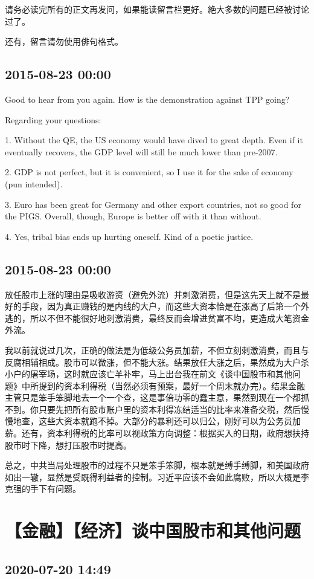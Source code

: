 \documentclass[twocolumn]{ctexart}
\begin{document}
请务必读完所有的正文再发问，如果能读留言栏更好。絶大多数的问题已经被讨论过了。

还有，留言请勿使用俳句格式。\subsection*{2015-08-23 00:00}
Good to hear from you again. How is the demonstration against TPP going?

Regarding your questions:

1. Without the QE, the US economy would have dived to great depth. Even if it eventually recovers, the GDP level will still be much lower than pre-2007.

2. GDP is not perfect, but it is convenient, so I use it for the sake of economy (pun intended).

3. Euro has been great for Germany and other export countries, not so good for the PIGS. Overall, though, Europe is better off with it than without.

4. Yes, tribal bias ends up hurting oneself. Kind of a poetic justice.\subsection*{2015-08-23 00:00}
放任股市上涨的理由是吸收游资（避免外流）并刺激消费，但是这先天上就不是最好的手段，因为真正赚钱的是内线的大户，而这些大资本恰是在涨高了后第一个外逃的，所以不但不能很好地刺激消费，最终反而会增进贫富不均，更造成大笔资金外流。

我以前就说过几次，正确的做法是为低级公务员加薪，不但立刻刺激消费，而且与反腐相辅相成。股市可以微涨，但不能大涨。结果放任大涨之后，果然成为大户杀小户的屠宰场，这时就应该亡羊补牢，马上出台我在前文《谈中国股市和其他问题》中所提到的资本利得税（当然必须有预案，最好一个周末就办完）。结果金融主管只是笨手笨脚地去一个一个查，这是事倍功零的蠢主意，果然到现在一个都抓不到。你只要先把所有股市账户里的资本利得冻结适当的比率来准备交税，然后慢慢地查，这些大资本就跑不掉。大部分的暴利还可以归公，刚好可以为公务员加薪。还有，资本利得税的比率可以视政策方向调整：根据买入的日期，政府想扶持股市时下降，想打压股市时提高。

总之，中共当局处理股市的过程不只是笨手笨脚，根本就是缚手缚脚，和美国政府如出一辙，显然是受既得利益者的控制。习近平应该不会如此腐败，所以大概是李克强的手下有问题。\section*{【金融】【经济】谈中国股市和其他问题}
\subsection*{2020-07-20 14:49}
\end{document}

